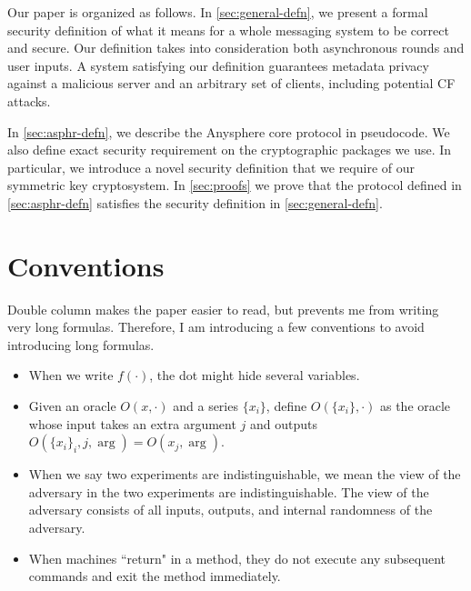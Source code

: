 
Our paper is organized as follows. In \cref{sec:general-defn}, we present a formal security definition of what it means for a whole messaging system to be correct and secure. Our definition takes into consideration both asynchronous rounds and user inputs. A system satisfying our definition guarantees metadata privacy against a malicious server and an arbitrary set of clients, including potential CF attacks.

In \cref{sec:asphr-defn}, we describe the Anysphere core protocol in pseudocode. We also define exact security requirement on the cryptographic packages we use. In particular, we introduce a novel security definition that we require of our symmetric key cryptosystem. In \cref{sec:proofs} we prove that the protocol defined in \cref{sec:asphr-defn} satisfies the security definition in \cref{sec:general-defn}.



\section{Conventions}
Double column makes the paper easier to read, but prevents me from writing very long formulas. Therefore, I am introducing a few conventions to avoid introducing long formulas.
\begin{itemize}
    \item When we write $f(\cdot)$, the dot might hide several variables.
    
    \item Given an oracle $O(x, \cdot)$ and a series $\{x_i\}$, define $O(\{x_i\}, \cdot)$ as the oracle whose input takes an extra argument $j$ and outputs $O(\{x_i\}_i, j, \arg) = O(x_j, \arg)$.

    \item When we say two experiments are indistinguishable, we mean the view of the adversary in the two experiments are indistinguishable. The view of the adversary consists of all inputs, outputs, and internal randomness of the adversary.
    
    \item When machines ``return" in a method, they do not execute any subsequent commands and exit the method immediately.
\end{itemize}